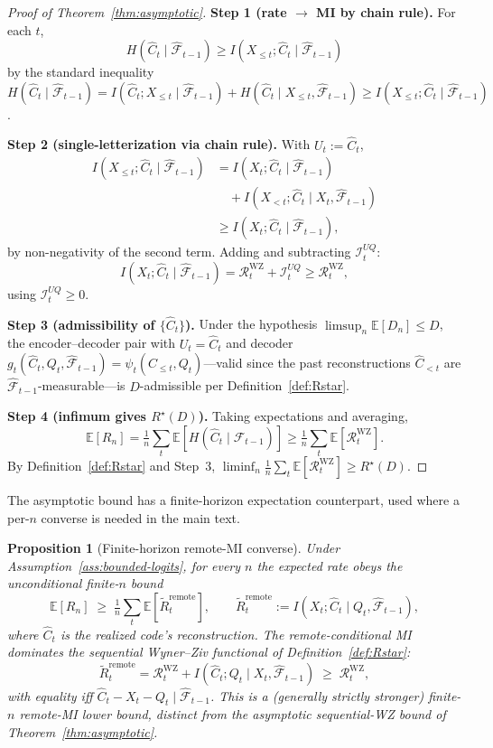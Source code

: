 \documentclass[11pt]{article}
\newcommand{\E}{\mathbb{E}}
\newcommand{\F}{\mathcal{F}}
\newcommand{\Fhat}{\hat{\F}}
\newcommand{\Chat}{\hat{C}}
\theoremstyle{plain}
\newtheorem{proposition}[theorem]{Proposition}
\theoremstyle{definition}
\theoremstyle{remark}
\begin{document}
\begin{proof}[Proof of Theorem~\ref{thm:asymptotic}]
\textbf{Step 1 (rate $\to$ MI by chain rule).}
For each $t$,
\[
H(\Chat_t \mid \Fhat_{t-1})
\geq I(X_{\leq t}; \Chat_t \mid \Fhat_{t-1})
\]
by the standard inequality $H(\Chat_t \mid \Fhat_{t-1})
= I(\Chat_t; X_{\leq t} \mid \Fhat_{t-1})
+ H(\Chat_t \mid X_{\leq t}, \Fhat_{t-1})
\geq I(X_{\leq t}; \Chat_t \mid \Fhat_{t-1})$.

\textbf{Step 2 (single-letterization via chain rule).}
With $U_t := \Chat_t$,
\[
\begin{aligned}
I(X_{\leq t}; \Chat_t \mid \Fhat_{t-1})
&= I(X_t; \Chat_t \mid \Fhat_{t-1}) \\
&\quad + I(X_{<t}; \Chat_t \mid X_t, \Fhat_{t-1}) \\
&\geq I(X_t; \Chat_t \mid \Fhat_{t-1}),
\end{aligned}
\]
by non-negativity of the second term. Adding and subtracting
$\mathcal{I}_t^{UQ}$:
\[
I(X_t; \Chat_t \mid \Fhat_{t-1})
= \mathcal{R}_t^{\mathrm{WZ}} + \mathcal{I}_t^{UQ} \geq \mathcal{R}_t^{\mathrm{WZ}},
\]
using $\mathcal{I}_t^{UQ} \geq 0$.

\textbf{Step 3 (admissibility of $\{\Chat_t\}$).}
Under the hypothesis $\limsup_n \E[D_n] \leq D$, the encoder--decoder
pair with $U_t = \Chat_t$ and decoder
$g_t(\Chat_t, Q_t, \Fhat_{t-1}) = \psi_t(\Chat_{\le t}, Q_t)$---valid
since the past reconstructions $\Chat_{<t}$ are
$\Fhat_{t-1}$-measurable---is $D$-admissible per
Definition~\ref{def:Rstar}.

\textbf{Step 4 (infimum gives $R^\star(D)$).}
Taking expectations and averaging,
\[
\E[R_n] = \tfrac{1}{n}\sum_t \E[H(\Chat_t \mid \Fhat_{t-1})]
\geq \tfrac{1}{n}\sum_t \E[\mathcal{R}_t^{\mathrm{WZ}}].
\]
By Definition~\ref{def:Rstar} and Step~3,
$\liminf_n \tfrac{1}{n}\sum_t \E[\mathcal{R}_t^{\mathrm{WZ}}] \geq R^\star(D)$.
\end{proof}

The asymptotic bound has a finite-horizon expectation counterpart,
used where a per-$n$ converse is needed in the main text.

\begin{proposition}[Finite-horizon remote-MI converse]\label{thm:finite-sample}
Under Assumption~\ref{ass:bounded-logits}, for every $n$ the expected
rate obeys the unconditional finite-$n$ bound
\[
\E[R_n] \;\ge\; \tfrac1n\sum_t \E[\widetilde R_t^{\mathrm{remote}}],
\qquad
\widetilde R_t^{\mathrm{remote}} := I(X_t;\Chat_t \mid Q_t,\Fhat_{t-1}),
\]
where $\Chat_t$ is the realized code's reconstruction. The
remote-conditional MI dominates the sequential Wyner--Ziv functional of
Definition~\ref{def:Rstar}:
\[
\widetilde R_t^{\mathrm{remote}}
= \mathcal{R}_t^{\mathrm{WZ}} + I(\Chat_t;Q_t \mid X_t,\Fhat_{t-1})
\;\ge\; \mathcal{R}_t^{\mathrm{WZ}},
\]
with equality iff $\Chat_t - X_t - Q_t \mid \Fhat_{t-1}$. This is a
(generally strictly stronger) finite-$n$ remote-MI lower bound,
distinct from the asymptotic sequential-WZ bound of
Theorem~\ref{thm:asymptotic}.
\end{proposition}
\end{document}
